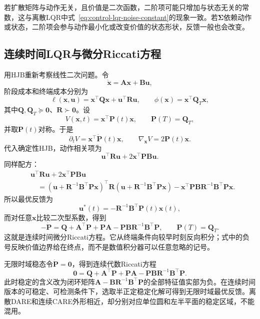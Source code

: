 若扩散矩阵与动作无关，且价值是二次函数，二阶项可能只增加与状态无关的常数，这与离散LQR中式~\eqref{eq:control-lqr-noise-constant}的现象一致。若$\bm{\Sigma}$依赖动作或状态，二阶项会参与动作最小化或改变价值的状态形状，反馈一般也会改变。
\subsection{连续时间LQR与微分Riccati方程}
用HJB重新考察线性二次问题。令
\[
  \dot{\bm{x}}
  =
  \bm{A}\bm{x}+\bm{B}\bm{u},
\]
阶段成本和终端成本分别为
\[
  \ell(\bm{x},\bm{u})
  =
  \bm{x}^{\top}\bm{Q}\bm{x}
  +
  \bm{u}^{\top}\bm{R}\bm{u},
  \qquad
  \phi(\bm{x})
  =
  \bm{x}^{\top}\bm{Q}_T\bm{x},
\]
其中$\bm{Q},\bm{Q}_T\succeq\bm{0}$、$\bm{R}\succ\bm{0}$。设
\[
  V(\bm{x},t)
  =
  \bm{x}^{\top}\bm{P}(t)\bm{x},
  \qquad
  \bm{P}(T)=\bm{Q}_T,
\]
并取$\bm{P}(t)$对称。于是
\[
  \partial_tV
  =
  \bm{x}^{\top}\dot{\bm{P}}(t)\bm{x},
  \qquad
  \nabla_{\bm{x}}V
  =
  2\bm{P}(t)\bm{x}.
\]
代入确定性HJB，动作相关项为
\[
  \bm{u}^{\top}\bm{R}\bm{u}
  +
  2\bm{x}^{\top}\bm{P}\bm{B}\bm{u}.
\]
同样配方：
\begin{align*}
  &\bm{u}^{\top}\bm{R}\bm{u}
  +
  2\bm{x}^{\top}\bm{P}\bm{B}\bm{u}\\
  &\quad=
  \left(
    \bm{u}+\bm{R}^{-1}\bm{B}^{\top}\bm{P}\bm{x}
  \right)^{\top}
  \bm{R}
  \left(
    \bm{u}+\bm{R}^{-1}\bm{B}^{\top}\bm{P}\bm{x}
  \right)
  -
  \bm{x}^{\top}
  \bm{P}\bm{B}\bm{R}^{-1}\bm{B}^{\top}\bm{P}
  \bm{x}.
\end{align*}
所以最优反馈为
\begin{equation}
  \bm{u}^{\ast}(t)
  =
  -\bm{R}^{-1}\bm{B}^{\top}\bm{P}(t)\bm{x}(t),
  \label{eq:control-continuous-lqr-gain}
\end{equation}
而对任意$\bm{x}$比较二次型系数，得到
\begin{equation}
  -\dot{\bm{P}}
  =
  \bm{Q}
  +
  \bm{A}^{\top}\bm{P}
  +
  \bm{P}\bm{A}
  -
  \bm{P}\bm{B}\bm{R}^{-1}\bm{B}^{\top}\bm{P},
  \qquad
  \bm{P}(T)=\bm{Q}_T.
  \label{eq:control-continuous-riccati}
\end{equation}
这就是连续时间微分Riccati方程。它从终端条件向较早时刻反向积分；式中的负号反映价值边界给在终点，而不是数值积分器可以任意忽略的记号。

无限时域稳态令$\dot{\bm{P}}=\bm{0}$，得到连续代数Riccati方程
\begin{equation}
  \bm{0}
  =
  \bm{Q}
  +
  \bm{A}^{\top}\bm{P}
  +
  \bm{P}\bm{A}
  -
  \bm{P}\bm{B}\bm{R}^{-1}\bm{B}^{\top}\bm{P}.
  \label{eq:control-care}
\end{equation}
此时稳定的含义改为闭环矩阵$\bm{A}-\bm{B}\bm{R}^{-1}\bm{B}^{\top}\bm{P}$的全部特征值实部为负。在连续时间版本的可稳定、可检测条件下，选取半正定稳定化解可得到无限时域最优反馈。离散DARE和连续CARE外形相近，却分别对应单位圆和左半平面的稳定区域，不能混用。
